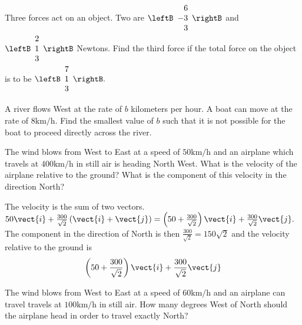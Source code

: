 \begin{enumialphparenastyle}
\begin{ex} Three forces act on an object. Two are $\leftB
\begin{array}{r}
6 \\
-3 \\
3
\end{array}
\rightB $ and $\leftB
\begin{array}{r}
2 \\
1 \\
3
\end{array}
\rightB $ Newtons. Find the third force if the total force on the object is
to be $\leftB
\begin{array}{r}
7 \\
1 \\
3
\end{array}
\rightB .$ \vspace{1mm}
\end{ex}

\begin{ex} A river flows West at the rate of $b$ kilometers per hour. A boat can move
at the rate of $8\textrm{km}/\textrm{h}$. Find the smallest value of $b$ such that
it is not possible for the boat to proceed directly across the river.
\vspace{1mm}
\end{ex}

\begin{ex} The wind blows from West to East at a speed of $50\textrm{km}/\textrm{h}$ and
an airplane which travels at $400\textrm{km}/\textrm{h}$ in still air is heading
North West. What is the velocity of the airplane relative to the ground?
What is the component of this velocity in the direction North? \vspace{1mm}
\begin{sol}
The velocity is the sum of two vectors. $50\vect{i}+\frac{
300}{\sqrt{2}} \left( \vect{i}+\vect{j}\right) =\left( 50+\frac{300}{\sqrt{2}}
\right) \vect{i}+ \frac{300}{\sqrt{2}}\vect{j}.$ The component in the
direction of North is then $\frac{300}{\sqrt{2}}= 150\sqrt{2}$
and the velocity relative to the ground is
\[
\left( 50+\frac{300}{\sqrt{2}}\right) \vect{i}+\frac{300}{\sqrt{2}}\vect{j}
\]
\end{sol}
\end{ex}

\begin{ex} The wind blows from West to East at a speed of $60\textrm{km}/\textrm{h}$ and
an airplane can travel travels at $100\textrm{km}/\textrm{h}$ in still air. How
many degrees West of North should the airplane head in order to travel
exactly North? \vspace{1mm}
\end{ex}



\end{enumialphparenastyle}

